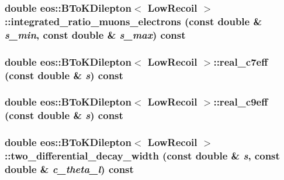 \label{classeos_1_1BToKDilepton_3_01LowRecoil_01_4_a6e959efacf222941a894a5363228603b}
\hypertarget{classeos_1_1BToKDilepton_3_01LowRecoil_01_4_aeeffa11fc2582619a076852898ff1787}{
\subsubsection[{integrated\_\-ratio\_\-muons\_\-electrons}]{\setlength{\rightskip}{0pt plus 5cm}double eos::BToKDilepton$<$ {\bf LowRecoil} $>$::integrated\_\-ratio\_\-muons\_\-electrons (const double \& {\em s\_\-min}, \/  const double \& {\em s\_\-max}) const}}
\label{classeos_1_1BToKDilepton_3_01LowRecoil_01_4_aeeffa11fc2582619a076852898ff1787}
\hypertarget{classeos_1_1BToKDilepton_3_01LowRecoil_01_4_af66edef64470949e6b38a2de1af2e5fb}{
\subsubsection[{real\_\-c7eff}]{\setlength{\rightskip}{0pt plus 5cm}double eos::BToKDilepton$<$ {\bf LowRecoil} $>$::real\_\-c7eff (const double \& {\em s}) const}}
\label{classeos_1_1BToKDilepton_3_01LowRecoil_01_4_af66edef64470949e6b38a2de1af2e5fb}
\hypertarget{classeos_1_1BToKDilepton_3_01LowRecoil_01_4_a8acf4f28f1cb267049ebed550784e25e}{
\subsubsection[{real\_\-c9eff}]{\setlength{\rightskip}{0pt plus 5cm}double eos::BToKDilepton$<$ {\bf LowRecoil} $>$::real\_\-c9eff (const double \& {\em s}) const}}
\label{classeos_1_1BToKDilepton_3_01LowRecoil_01_4_a8acf4f28f1cb267049ebed550784e25e}
\hypertarget{classeos_1_1BToKDilepton_3_01LowRecoil_01_4_a2fd7d6d0e830e35f45f8d434a4b10059}{
\subsubsection[{two\_\-differential\_\-decay\_\-width}]{\setlength{\rightskip}{0pt plus 5cm}double eos::BToKDilepton$<$ {\bf LowRecoil} $>$::two\_\-differential\_\-decay\_\-width (const double \& {\em s}, \/  const double \& {\em c\_\-theta\_\-l}) const}}
